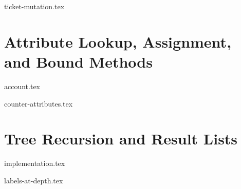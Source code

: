 \documentclass{exam}
\begin{document}
\begin{questions}
    \setcounter{question}{3}
    {ticket-mutation.tex}
\end{questions}

\newpage
\section{Attribute Lookup, Assignment, and Bound Methods}
\begin{questions}
\setcounter{question}{4}
    {account.tex}

    {counter-attributes.tex}
\end{questions}

\newpage
\section{Tree Recursion and Result Lists}
\begingroup
{implementation.tex}
\endgroup
\begin{questions}
    \setcounter{question}{6}
    {labels-at-depth.tex}
\end{questions}
\end{document}
